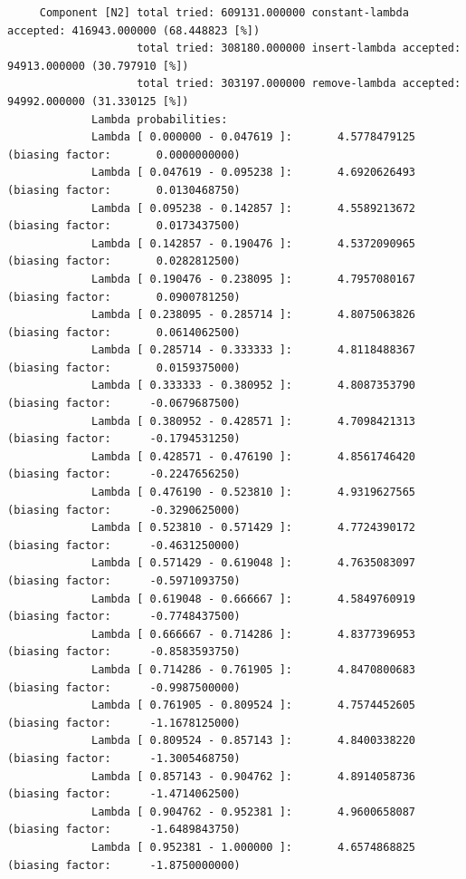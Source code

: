 \begin{tiny}
\begin{verbatim}
     Component [N2] total tried: 609131.000000 constant-lambda accepted: 416943.000000 (68.448823 [%])
                    total tried: 308180.000000 insert-lambda accepted: 94913.000000 (30.797910 [%])
                    total tried: 303197.000000 remove-lambda accepted: 94992.000000 (31.330125 [%])
             Lambda probabilities:
             Lambda [ 0.000000 - 0.047619 ]:       4.5778479125 (biasing factor:       0.0000000000)
             Lambda [ 0.047619 - 0.095238 ]:       4.6920626493 (biasing factor:       0.0130468750)
             Lambda [ 0.095238 - 0.142857 ]:       4.5589213672 (biasing factor:       0.0173437500)
             Lambda [ 0.142857 - 0.190476 ]:       4.5372090965 (biasing factor:       0.0282812500)
             Lambda [ 0.190476 - 0.238095 ]:       4.7957080167 (biasing factor:       0.0900781250)
             Lambda [ 0.238095 - 0.285714 ]:       4.8075063826 (biasing factor:       0.0614062500)
             Lambda [ 0.285714 - 0.333333 ]:       4.8118488367 (biasing factor:       0.0159375000)
             Lambda [ 0.333333 - 0.380952 ]:       4.8087353790 (biasing factor:      -0.0679687500)
             Lambda [ 0.380952 - 0.428571 ]:       4.7098421313 (biasing factor:      -0.1794531250)
             Lambda [ 0.428571 - 0.476190 ]:       4.8561746420 (biasing factor:      -0.2247656250)
             Lambda [ 0.476190 - 0.523810 ]:       4.9319627565 (biasing factor:      -0.3290625000)
             Lambda [ 0.523810 - 0.571429 ]:       4.7724390172 (biasing factor:      -0.4631250000)
             Lambda [ 0.571429 - 0.619048 ]:       4.7635083097 (biasing factor:      -0.5971093750)
             Lambda [ 0.619048 - 0.666667 ]:       4.5849760919 (biasing factor:      -0.7748437500)
             Lambda [ 0.666667 - 0.714286 ]:       4.8377396953 (biasing factor:      -0.8583593750)
             Lambda [ 0.714286 - 0.761905 ]:       4.8470800683 (biasing factor:      -0.9987500000)
             Lambda [ 0.761905 - 0.809524 ]:       4.7574452605 (biasing factor:      -1.1678125000)
             Lambda [ 0.809524 - 0.857143 ]:       4.8400338220 (biasing factor:      -1.3005468750)
             Lambda [ 0.857143 - 0.904762 ]:       4.8914058736 (biasing factor:      -1.4714062500)
             Lambda [ 0.904762 - 0.952381 ]:       4.9600658087 (biasing factor:      -1.6489843750)
             Lambda [ 0.952381 - 1.000000 ]:       4.6574868825 (biasing factor:      -1.8750000000)
\end{verbatim}
\end{tiny}

